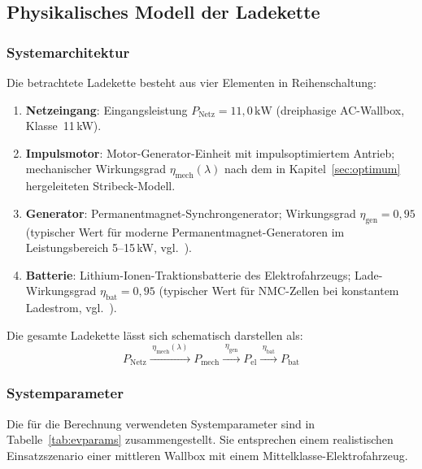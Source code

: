 ﻿\documentclass[a4paper,12pt]{article}
\begin{document}
\subsection{Physikalisches Modell der Ladekette}

\subsubsection{Systemarchitektur}

Die betrachtete Ladekette besteht aus vier Elementen in Reihenschaltung:

\begin{enumerate}
  \item \textbf{Netzeingang}: Eingangsleistung $P_\text{Netz} = 11{,}0\,\text{kW}$
    (dreiphasige AC-Wallbox, Klasse~11\,kW).
  \item \textbf{Impulsmotor}: Motor-Generator-Einheit mit impulsoptimiertem
    Antrieb; mechanischer Wirkungsgrad $\eta_\text{mech}(\lambda)$ nach
    dem in Kapitel~\ref{sec:optimum} hergeleiteten Stribeck-Modell.
  \item \textbf{Generator}: Permanentmagnet-Synchrongenerator; Wirkungsgrad
    $\eta_\text{gen} = 0{,}95$ (typischer Wert für moderne Permanentmagnet-Generatoren
    im Leistungsbereich 5--15\,kW, vgl.~\cite{heywood1988}).
  \item \textbf{Batterie}: Lithium-Ionen-Traktionsbatterie des Elektrofahrzeugs;
    Lade-Wirkungsgrad $\eta_\text{bat} = 0{,}95$ (typischer Wert für
    NMC-Zellen bei konstantem Ladestrom, vgl.~\cite{bosch2014}).
\end{enumerate}

Die gesamte Ladekette lässt sich schematisch darstellen als:
\begin{equation}
  P_\text{Netz}
  \xrightarrow{\;\eta_\text{mech}(\lambda)\;}
  P_\text{mech}
  \xrightarrow{\;\eta_\text{gen}\;}
  P_\text{el}
  \xrightarrow{\;\eta_\text{bat}\;}
  P_\text{bat}
\end{equation}

\subsubsection{Systemparameter}

Die für die Berechnung verwendeten Systemparameter sind in
Tabelle~\ref{tab:evparams} zusammengestellt. Sie entsprechen einem
realistischen Einsatzszenario einer mittleren Wallbox mit einem
Mittelklasse-Elektrofahrzeug.
\end{document}
